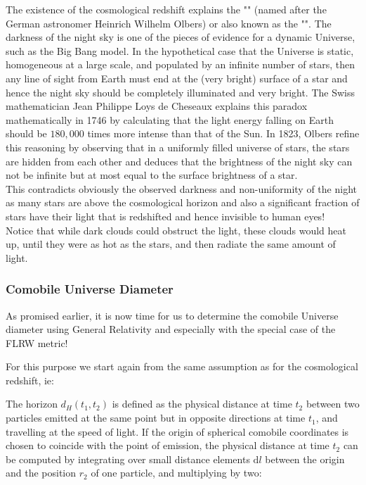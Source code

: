 	\begin{tcolorbox}[title=Remark,colframe=black,arc=10pt]
	The existence of the cosmological redshift explains the "" (named after the German astronomer Heinrich Wilhelm Olbers) or also known as the "". The darkness of the night sky is one of the pieces of evidence for a dynamic Universe, such as the Big Bang model. In the hypothetical case that the Universe is static, homogeneous at a large scale, and populated by an infinite number of stars, then any line of sight from Earth must end at the (very bright) surface of a star and hence the night sky should be completely illuminated and very bright. The Swiss mathematician Jean Philippe Loys de Cheseaux explains this paradox mathematically in 1746 by calculating that the light energy falling on Earth should be $180,000$ times more intense than that of the Sun. In 1823, Olbers refine this reasoning by observing that in a uniformly filled universe of stars, the stars are hidden from each other and deduces that the brightness of the night sky can not be infinite but at most equal to the surface brightness of a star.\\
	
	This contradicts obviously the observed darkness and non-uniformity of the night as many stars are above the cosmological horizon and also a significant fraction of stars have their light that is redshifted and hence invisible to human eyes!\\
	
	Notice that while dark clouds could obstruct the light, these clouds would heat up, until they were as hot as the stars, and then radiate the same amount of light.
	\end{tcolorbox}
	
	\pagebreak
	\subsubsection{Comobile Universe Diameter}
	As promised earlier, it is now time for us to determine the comobile Universe diameter using General Relativity and especially with the special case of the FLRW metric!
	
	For this purpose we start again from the same assumption as for the cosmological redshift, ie:
	
	
	The horizon $d_H(t_1, t_2)$ is defined as the physical distance at time $t_2$ between two particles emitted at the same point but in opposite directions at time $t_1$, and travelling at the speed of light. If the origin of spherical comobile coordinates is chosen to coincide with the point of emission, the physical distance at time $t_2$ can be computed by integrating over small distance elements $\mathrm{d}l$ between the origin and the position $r_2$ of one particle, and multiplying by two:
	
